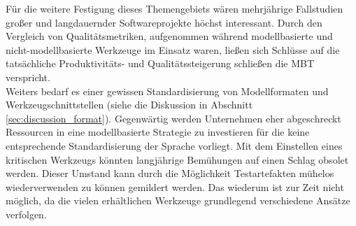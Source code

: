 Für die weitere Festigung dieses Themengebiets wären mehrjährige Fallstudien großer und langdauernder Softwareprojekte höchst interessant. Durch den Vergleich von Qualitätsmetriken, aufgenommen während modellbasierte und nicht-modellbasierte Werkzeuge im Einsatz waren, ließen sich Schlüsse auf die tatsächliche Produktivitäts- und Qualitätssteigerung schließen die \Gls{MBT} verspricht.\\
Weiters bedarf es einer gewissen Standardisierung von Modellformaten und Werkzeugschnittstellen (siehe die Diskussion in Abschnitt \ref{sec:discussion_format}). Gegenwärtig werden Unternehmen eher abgeschreckt Ressourcen in eine modellbasierte Strategie zu investieren für die keine entsprechende Standardisierung der Sprache vorliegt. Mit dem Einstellen eines kritischen Werkzeugs könnten langjährige Bemühungen auf einen Schlag obsolet werden. Dieser Umstand kann durch die Möglichkeit Testartefakten mühelos wiederverwenden zu können gemildert werden. Das wiederum ist zur Zeit nicht möglich, da die vielen erhältlichen Werkzeuge grundlegend verschiedene Ansätze verfolgen.



























